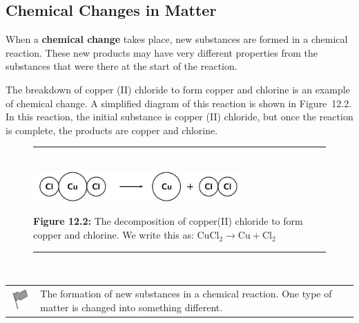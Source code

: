             \subsection{ Chemical Changes in Matter}
            \nopagebreak
      \label{m38709*id62778}When a \textbf{chemical change} takes place, new substances are formed in a chemical reaction. These new products may have very different properties from the substances that were there at the start of the reaction.\par 
      \label{m38709*id62788}The breakdown of copper (II) chloride to form copper and chlorine is an example of chemical change. A simplified diagram of this reaction is shown in Figure~12.2. In this reaction, the initial substance is copper (II) chloride, but once the reaction is complete, the products are copper and chlorine.\par 
    \setcounter{subfigure}{0}
	\begin{figure}[H] %
    \begin{center}
    \rule[.1in]{\figurerulewidth}{.005in} \\
        \label{m38709*uid5!!!underscore!!!media}\label{m38709*uid5!!!underscore!!!printimage}\includegraphics[width=300px]{col11305.imgs/m38709_CG10C4_002.png} %
      \vspace{2pt}
    \vspace{\rubberspace}\par \begin{cnxcaption}
	  \small \textbf{Figure 12.2: }The decomposition of copper(II) chloride to form copper and chlorine. We write this as: ${\mathrm{CuCl}}_{2}\to \mathrm{Cu}+{\mathrm{Cl}}_{2}$
	\end{cnxcaption}
    \vspace{.1in}
    \rule[.1in]{\figurerulewidth}{.005in} \\
    \end{center}
 \end{figure}       
\par
            \label{m38709*fhsst!!!underscore!!!id107}\begin{definition}
	  \begin{tabular*}{15 cm}{m{15 mm}m{}}
	\hspace*{-50pt}  \includegraphics[width=0.5in]{col11305.imgs/psflag2.png}   & \Definition{   \label{id2458579}\textbf{ Chemical change }} { \label{m38709*meaningfhsst!!!underscore!!!id107}
      The formation of new substances in a chemical reaction. One type of matter is changed into something different. 
       } 
      \end{tabular*}
      \end{definition}
